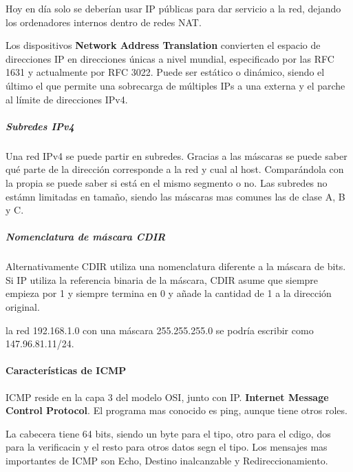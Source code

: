                 Hoy en día solo se deberían usar IP públicas para dar servicio a la red, dejando los ordenadores internos dentro de redes NAT.

                Los dispositivos \textbf{Network Address Translation} convierten el espacio de direcciones IP en direcciones únicas a nivel mundial, especificado por las RFC 1631 y actualmente por RFC 3022. Puede ser estático o dinámico, siendo el último el que permite una sobrecarga de múltiples IPs a una externa y el parche al límite de direcciones IPv4.

            \subparagraph{Subredes IPv4}
                Una red IPv4 se puede partir en subredes. Gracias a las máscaras se puede saber qué parte de la dirección corresponde a la red y cual al host. Comparándola con la propia se puede saber si está en el mismo segmento o no. Las subredes no estámn limitadas en tamaño, siendo las máscaras mas comunes las de clase A, B y C.

            \subparagraph{Nomenclatura de máscara CDIR}
                Alternativamente CDIR utiliza una nomenclatura diferente a la máscara de bits. Si IP utiliza la referencia binaria de la máscara, CDIR asume que siempre empieza por 1 y siempre termina en 0 y añade la cantidad de 1 a la dirección original.

                la red 192.168.1.0 con una máscara 255.255.255.0 se podría escribir como 147.96.81.11/24.

        \paragraph{Características de ICMP} %
            ICMP reside en la capa 3 del modelo OSI, junto con IP. \textbf{Internet Message Control Protocol}. El programa mas conocido es ping, aunque tiene otros roles.

            La cabecera tiene 64 bits, siendo un byte para el tipo, otro para el cdigo, dos para la verificacin y el resto para otros datos segn el tipo. Los mensajes mas importantes de ICMP son Echo, Destino inalcanzable y Redireccionamiento.

